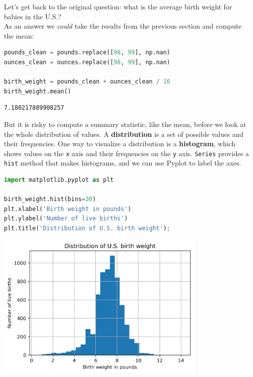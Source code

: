 Let's get back to the original question: what is the average birth
weight for babies in the U.S.?\\
As an answer we \emph{could} take the results from the previous section
and compute the mean:

\begin{lstlisting}[language=Python,style=source]
pounds_clean = pounds.replace([98, 99], np.nan)
ounces_clean = ounces.replace([98, 99], np.nan)

birth_weight = pounds_clean + ounces_clean / 16
birth_weight.mean()
\end{lstlisting}

\begin{lstlisting}[style=output]
7.180217889908257
\end{lstlisting}

But it is risky to compute a summary statistic, like the mean, before we
look at the whole distribution of values. A \textbf{distribution} is a
set of possible values and their frequencies. One way to visualize a
distribution is a \textbf{histogram}, which shows values on the
\passthrough{\lstinline!x!} axis and their frequencies on the
\passthrough{\lstinline!y!} axis. \passthrough{\lstinline!Series!}
provides a \passthrough{\lstinline!hist!} method that makes histograms,
and we can use Pyplot to label the axes.

\begin{lstlisting}[language=Python,style=source]
import matplotlib.pyplot as plt

birth_weight.hist(bins=30)
plt.xlabel('Birth weight in pounds')
plt.ylabel('Number of live births')
plt.title('Distribution of U.S. birth weight');
\end{lstlisting}

\begin{center}
\includegraphics[width=4in]{chapters/07_dataframes_files/07_dataframes_60_0.png}
\end{center}


